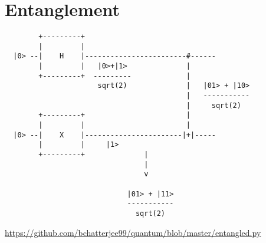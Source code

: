 \documentclass{article}
\begin{document}
\section{Entanglement}
\begin{verbatim}
        +---------+                                         
        |         |                                         
  |0> --|    H    |------------------------#------
        |         |   |0>+|1>              |               
        +---------+  ---------             |     
                      sqrt(2)              |   |01> + |10>    
                                           |   ----------- 
                                           |     sqrt(2)   
        +---------+                        |    
        |         |                        |    
  |0> --|    X    |-----------------------|+|-----
        |         |     |1>                    
        +---------+              |                   
                                 |                    
                                 v                  
                                                               
                             |01> + |11>                     
                             -----------
                               sqrt(2)              
\end{verbatim}
\href{https://github.com/bchatterjee99/quantum/blob/master/entangled.py}{https://github.com/bchatterjee99/quantum/blob/master/entangled.py}
\end{document}
